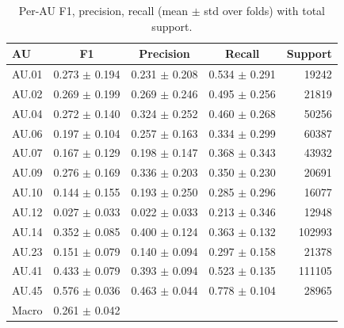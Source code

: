 \begin{table}[t]
\centering
\begin{tabular}{lcccr}
\toprule
AU & F1 & Precision & Recall & Support \\
\midrule
AU.01 & 0.273 $\pm$ 0.194 & 0.231 $\pm$ 0.208 & 0.534 $\pm$ 0.291 & 19242 \\
AU.02 & 0.269 $\pm$ 0.199 & 0.269 $\pm$ 0.246 & 0.495 $\pm$ 0.256 & 21819 \\
AU.04 & 0.272 $\pm$ 0.140 & 0.324 $\pm$ 0.252 & 0.460 $\pm$ 0.268 & 50256 \\
AU.06 & 0.197 $\pm$ 0.104 & 0.257 $\pm$ 0.163 & 0.334 $\pm$ 0.299 & 60387 \\
AU.07 & 0.167 $\pm$ 0.129 & 0.198 $\pm$ 0.147 & 0.368 $\pm$ 0.343 & 43932 \\
AU.09 & 0.276 $\pm$ 0.169 & 0.336 $\pm$ 0.203 & 0.350 $\pm$ 0.230 & 20691 \\
AU.10 & 0.144 $\pm$ 0.155 & 0.193 $\pm$ 0.250 & 0.285 $\pm$ 0.296 & 16077 \\
AU.12 & 0.027 $\pm$ 0.033 & 0.022 $\pm$ 0.033 & 0.213 $\pm$ 0.346 & 12948 \\
AU.14 & 0.352 $\pm$ 0.085 & 0.400 $\pm$ 0.124 & 0.363 $\pm$ 0.132 & 102993 \\
AU.23 & 0.151 $\pm$ 0.079 & 0.140 $\pm$ 0.094 & 0.297 $\pm$ 0.158 & 21378 \\
AU.41 & 0.433 $\pm$ 0.079 & 0.393 $\pm$ 0.094 & 0.523 $\pm$ 0.135 & 111105 \\
AU.45 & 0.576 $\pm$ 0.036 & 0.463 $\pm$ 0.044 & 0.778 $\pm$ 0.104 & 28965 \\
\midrule
Macro & 0.261 $\pm$ 0.042 & & & \\
\bottomrule
\end{tabular}
\caption{Per-AU F1, precision, recall (mean $\pm$ std over folds) with total support.}
\label{tab:per_au}
\end{table}
